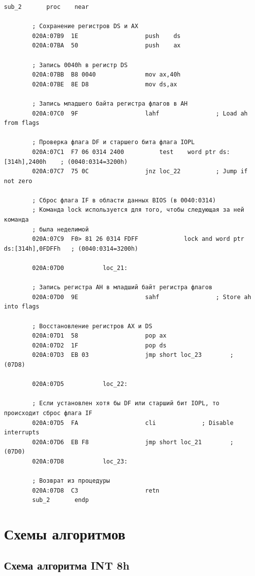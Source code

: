 \documentclass[14pt, a4paper]{article}
\begin{document}
	\begin{lstlisting}[style={asm}]
						sub_2		proc	near
		
		; Сохранение регистров DS и AX
		020A:07B9  1E					push	ds
		020A:07BA  50					push	ax
		
		; Запись 0040h в регистр DS
		020A:07BB  B8 0040				mov	ax,40h
		020A:07BE  8E D8				mov	ds,ax
		
		; Запись младшего байта регистра флагов в AH
		020A:07C0  9F					lahf				; Load ah from flags
		
		; Проверка флага DF и старшего бита флага IOPL
		020A:07C1  F7 06 0314 2400			test	word ptr ds:[314h],2400h	; (0040:0314=3200h)
		020A:07C7  75 0C				jnz	loc_22			; Jump if not zero
		
		; Сброс флага IF в области данных BIOS (в 0040:0314)
		; Команда lock используется для того, чтобы следующая за ней команда
		; была неделимой
		020A:07C9  F0> 81 26 0314 FDFF	           lock	and	word ptr ds:[314h],0FDFFh	; (0040:0314=3200h)
		
		020A:07D0			loc_21:
		
		; Запись регистра AH в младший байт регистра флагов
		020A:07D0  9E					sahf				; Store ah into flags
		
		; Восстановление регистров AX и DS
		020A:07D1  58					pop	ax
		020A:07D2  1F					pop	ds
		020A:07D3  EB 03				jmp	short loc_23		; (07D8)
		
		020A:07D5			loc_22:
		
		; Если установлен хотя бы DF или старший бит IOPL, то происходит сброс флага IF
		020A:07D5  FA					cli				; Disable interrupts
		020A:07D6  EB F8				jmp	short loc_21		; (07D0)
		020A:07D8			loc_23:
		
		; Возврат из процедуры
		020A:07D8  C3					retn
		sub_2		endp
	\end{lstlisting}
	
	\pagebreak
	
	\section*{Схемы алгоритмов}
	
	\subsection*{Схема алгоритма INT 8h}
	
\end{document}
